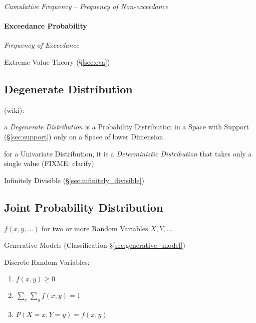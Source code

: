 \emph{Cumulative Frequency} -- \emph{Frequency of Non-exceedance}



\paragraph{Exceedance Probability}\label{sec:exceedance_probability}\hfill

\emph{Frequency of Exceedance}

Extreme Value Theory (\S\ref{sec:eva})



\subsection{Degenerate Distribution}\label{sec:degenerate_distribution}

(wiki):

a \emph{Degenerate Distribution} is a Probability Distribution in a Space with
Support (\S\ref{sec:support}) only on a Space of lower Dimension

for a Univariate Distribution, it is a \emph{Deterministic Distribution} that
takes only a single value (FIXME: clarify)

Infinitely Divisible (\S\ref{sec:infinitely_divisible})



\subsection{Joint Probability Distribution}\label{sec:joint_probability}

$f(x,y,\ldots)$ for two or more Random Variables $X,Y,\ldots$

\fist Generative Models (Classification \S\ref{sec:generative_model})

Discrete Random Variables:
\begin{enumerate}
  \item $f(x,y) \geq 0$
  \item $\sum_x \sum_y f(x,y) = 1$
  \item $P(X = x, Y = y) = f(x,y)$
\end{enumerate}


